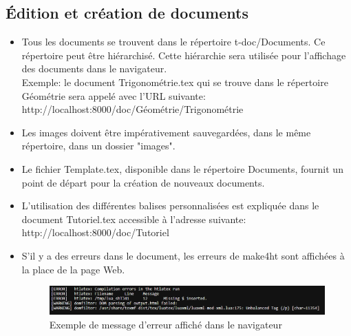 \documentclass[12pt,titlepage,oneside]{article}
\begin{document}
\subsection{Édition et création de documents}
\begin{itemize}
\item Tous les documents se trouvent dans le répertoire t-doc/Documents. Ce répertoire peut être hiérarchisé. Cette hiérarchie sera utilisée pour l'affichage des documents dans le navigateur.\\
Exemple: le document Trigonométrie.tex qui se trouve dans le répertoire Géométrie sera appelé avec l'URL suivante:\\
http://localhost:8000/doc/Géométrie/Trigonométrie\par

\item Les images doivent être impérativement sauvegardées, dans le même répertoire, dans un dossier "images".\par

\item Le fichier Template.tex, disponible dans le répertoire Documents, fournit un point de départ pour la création de nouveaux documents.\par

\item L'utilisation des différentes balises personnalisées est expliquée dans le document Tutoriel.tex accessible à l'adresse suivante:\\
http://localhost:8000/doc/Tutoriel\par

\item S'il y a des erreurs dans le document, les erreurs de make4ht sont affichées à la place de la page Web.
\begin{figure}[H]
\centering
\includegraphics[width=1\textwidth]{images/Erreur.png}\caption{Exemple de message d'erreur affiché dans le navigateur}
\end{figure}
\end{itemize}
\end{document}
